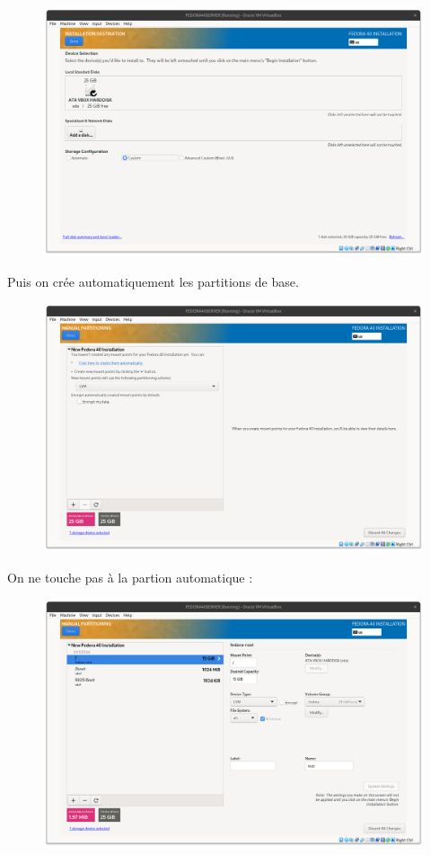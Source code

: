\documentclass{article}
\begin{document}
\begin{figure}[h!]
		\centering
		\includegraphics[width=1\textwidth]{vbox9.png}
\end{figure}

Puis on crée automatiquement les partitions de base.

\begin{figure}[h!]
		\centering
		\includegraphics[width=1\textwidth]{vbox10.png}
\end{figure}

\pagebreak
On ne touche pas à la partion automatique : 

\begin{figure}[h!]
		\centering
		\includegraphics[width=1\textwidth]{vbox11.png}
\end{figure}
\end{document}
